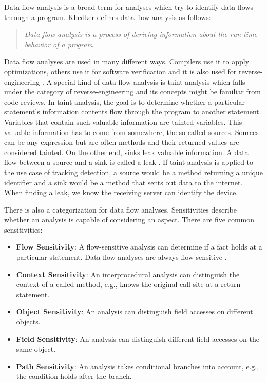 \documentclass[../draft.tex]{subfiles}
\begin{document}
    Data flow analysis is a broad term for analyses which try to identify data flows through a program. Khedker \cite{Khedker2009} defines data flow analysis as follows:
    \begin{quote}
        \textit{Data flow analysis is a process of deriving information about the run time behavior of a program.}
    \end{quote}
    Data flow analyses are used in many different ways. Compilers use it to apply optimizations, others use it for software verification and it is also used for reverse-engineering \cite{Khedker2009}. A special kind of data flow analysis is taint analysis which falls under the category of reverse-engineering and its concepts might be familiar from code reviews. In taint analysis, the goal is to determine whether a particular statement's information contents flow through the program to another statement. Variables that contain such valuable information are tainted variables. This valuable information has to come from somewhere, the so-called sources. Sources can be any expression but are often methods and their returned values are considered tainted. On the other end, sinks leak valuable information. A data flow between a source and a sink is called a leak \cite{Arzt2017PhD}. If taint analysis is applied to the use case of tracking detection, a source would be a method returning a unique identifier and a sink would be a method that sents out data to the internet. When finding a leak, we know the receiving server can identify the device.

    There is also a categorization for data flow analyses. Sensitivities describe whether an analysis is capable of considering an aspect. There are five common sensitivities: 
    \begin{itemize}
        \item \textbf{Flow Sensitivity}: A flow-sensitive analysis can determine if a fact holds at a particular statement. Data flow analyses are always flow-sensitive \cite{Khedker2009}.
        \item \textbf{Context Sensitivity}: An interprocedural analysis can distinguish the context of a called method, e.g., knows the original call site at a return statement.
        \item \textbf{Object Sensitivity}: An analysis can distinguish field accesses on different objects.
        \item \textbf{Field Sensitivity}: An analysis can distinguish different field accesses on the same object.
        \item \textbf{Path Sensitivity}: An analysis takes conditional branches into account, e.g., the condition holds after the branch.
    \end{itemize}
\end{document}
